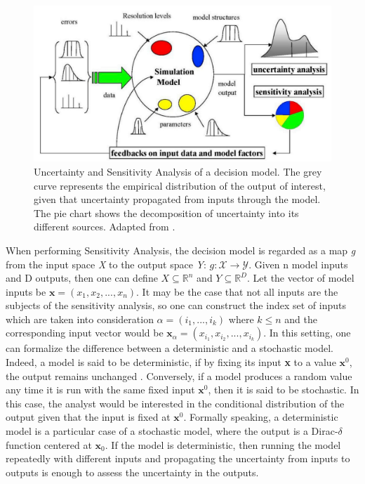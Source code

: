 \begin{figure}[H]
    \centering
    \includegraphics[scale = 0.7]{tex/pics/sensitivity_saltelli.png}
    \caption{Uncertainty and Sensitivity Analysis of a decision model. The grey curve represents the empirical distribution of the output of interest, given that uncertainty propagated from inputs through the model. The pie chart shows the decomposition of uncertainty into its different sources. Adapted from \textcite{saltelli}.}
    \label{fig:sensitivity_saltelli}
\end{figure}

When performing Sensitivity Analysis, the decision model is regarded as a map \textit{g} from the input space \textit{X} to the output space \textit{Y}: $g: \mathcal{X} \rightarrow \mathcal{Y}$. Given n model inputs and D outputs, then one can define $X \subseteq \mathbb{R}^n$ and $Y \subseteq \mathbb{R}^D$. Let the vector of model inputs be $\mathbf{x} = (x_1, x_2, ..., x_n)$. It may be the case that not all inputs are the subjects of the sensitivity analysis, so one can construct the index set of inputs which are taken into consideration $\alpha = (i_1, ..., i_k)$ where $k\leq n$ and the corresponding input vector would be $\textbf{x}_{\alpha} = (x_{i_1}, x_{i_2}, ..., x_{i_k})$. In this setting, one can formalize the difference between a deterministic and a stochastic model. Indeed, a model is said to be deterministic, if by fixing its input \textbf{x} to a value $\textbf{x}^0$, the output remains unchanged \cite{Borgonovo2017SensitivityAA}. Conversely, if a model produces a random value any time it is run with the same fixed input $\textbf{x}^0$, then it is said to be stochastic. In this case, the analyst would be interested in the conditional distribution of the output given that the input is fixed at $\textbf{x}^0$. Formally speaking, a deterministic model is a particular case of a stochastic model, where the output is a Dirac-$\delta$ function centered at $\textbf{x}_0$. If the model is deterministic, then running the model repeatedly with different inputs and propagating the uncertainty from inputs to outputs is enough to assess the uncertainty in the outputs. 

